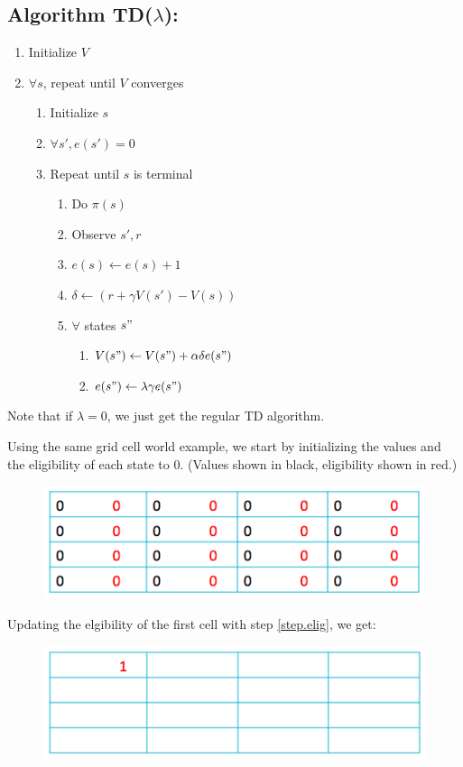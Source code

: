 \documentclass[11pt]{article}
\numberwithin{equation}{section}
\numberwithin{figure}{section}
\begin{document}
\subsection*{Algorithm TD($\lambda$):}
\begin{enumerate}
	\item Initialize $V$
	\item $\forall s$, repeat until $V$ converges
	\begin{enumerate}
		\item Initialize $s$
		\item $\forall s', e(s') = 0$
		\item Repeat until $s$ is terminal
		\begin{enumerate}
			\item Do $\pi(s)$
			\item Observe $s', r$
			\item $e(s) \leftarrow e(s) + 1$
			\label{step.elig}
			\item $\delta \leftarrow (r+\gamma V(s') - V(s))$
			\item $\forall$ states $s"$
			\label{step.forall}
			\begin{enumerate}
				\item $V(s") \leftarrow V(s") + \alpha \delta e(s")$
				\item $e(s") \leftarrow \lambda \gamma e(s")$
				\label{step.elig2}
			\end{enumerate}	
		\end{enumerate}		
	\end{enumerate}		
\end{enumerate}		
Note that if $\lambda = 0$, we just get the regular TD algorithm.

Using the same grid cell world example, we start by initializing the values and the eligibility of each state to $0$. (Values shown in black, eligibility shown in red.)

\begin{figure}[h!]
	\centering
	\includegraphics[width=.4\columnwidth]{./images/fig5}
	\label{fig.fig5}
\end{figure}

Updating the elgibility of the first cell with step \ref{step.elig}, we get:

\begin{figure}[h!]
	\centering
	\includegraphics[width=.4\columnwidth]{./images/fig6}
	\label{fig.fig6}
\end{figure}
\end{document}
